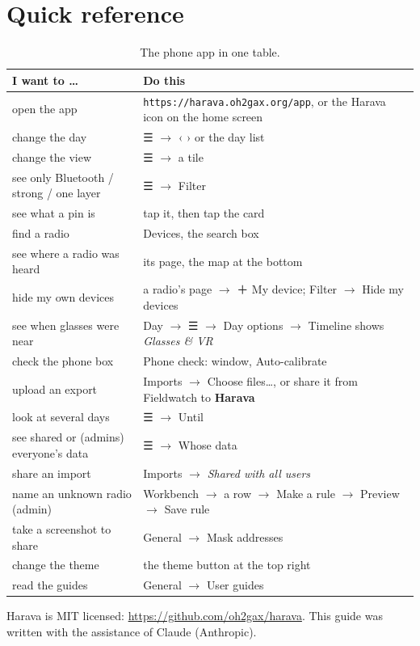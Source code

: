 \documentclass[10pt,a4paper]{article}
\newcommand{\ui}[1]{\textsf{\small #1}}            %
\begin{document}
\section{Quick reference}\label{sec:quick}
\begin{table}[H]\small\centering
\begin{tabularx}{\textwidth}{>{\raggedright}p{5.2cm}X}
\toprule
\textbf{I want to \dots} & \textbf{Do this}\\
\midrule
open the app & \texttt{https://harava.oh2gax.org/app}, or the Harava icon on the home screen\\
change the day & \ui{☰} $\rightarrow$ \ui{‹} \ui{›} or the day list\\
change the view & \ui{☰} $\rightarrow$ a tile\\
see only Bluetooth / strong / one layer & \ui{☰} $\rightarrow$ Filter\\
see what a pin is & tap it, then tap the card\\
find a radio & Devices, the search box\\
see where a radio was heard & its page, the map at the bottom\\
hide my own devices & a radio's page $\rightarrow$ \ui{＋ My device}; Filter $\rightarrow$ \ui{Hide my devices}\\
see when glasses were near & Day $\rightarrow$ \ui{☰} $\rightarrow$ Day options $\rightarrow$ \ui{Timeline shows} \emph{Glasses \& VR}\\
check the phone box & Phone check: window, \ui{Auto-calibrate}\\
upload an export & Imports $\rightarrow$ \ui{Choose files…}, or share it from Fieldwatch to \textbf{Harava}\\
look at several days & \ui{☰} $\rightarrow$ \ui{Until}\\
see shared or (admins) everyone's data & \ui{☰} $\rightarrow$ \ui{Whose data}\\
share an import & Imports $\rightarrow$ \emph{Shared with all users}\\
name an unknown radio (admin) & Workbench $\rightarrow$ a row $\rightarrow$ \ui{Make a rule} $\rightarrow$ \ui{Preview} $\rightarrow$ \ui{Save rule}\\
take a screenshot to share & General $\rightarrow$ \ui{Mask addresses}\\
change the theme & the theme button at the top right\\
read the guides & General $\rightarrow$ \ui{User guides}\\
\bottomrule
\end{tabularx}
\caption{The phone app in one table.}
\end{table}

\vfill
{\small Harava is MIT licensed: \url{https://github.com/oh2gax/harava}. This guide was written with the assistance of Claude (Anthropic).}
\end{document}
